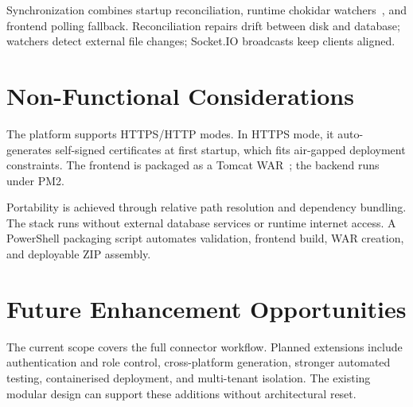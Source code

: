 Synchronization combines startup reconciliation, runtime chokidar watchers~\cite{chokidar_docs}, and frontend polling fallback. Reconciliation repairs drift between disk and database; watchers detect external file changes; Socket.IO broadcasts keep clients aligned.

\section{Non-Functional Considerations}

The platform supports HTTPS/HTTP modes. In HTTPS mode, it auto-generates self-signed certificates at first startup, which fits air-gapped deployment constraints. The frontend is packaged as a Tomcat WAR~\cite{tomcat_docs}; the backend runs under PM2.

Portability is achieved through relative path resolution and dependency bundling. The stack runs without external database services or runtime internet access. A PowerShell packaging script automates validation, frontend build, WAR creation, and deployable ZIP assembly.

\section{Future Enhancement Opportunities}

The current scope covers the full connector workflow. Planned extensions include authentication and role control, cross-platform generation, stronger automated testing, containerised deployment, and multi-tenant isolation. The existing modular design can support these additions without architectural reset.

